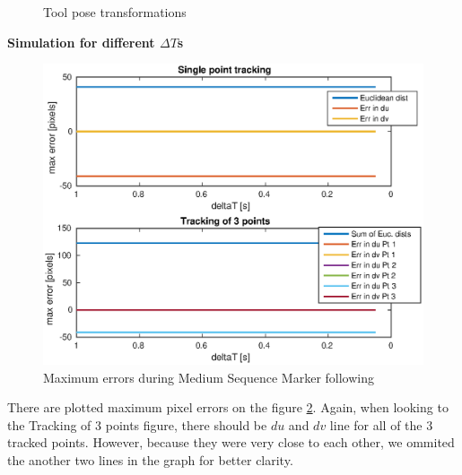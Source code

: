 \documentclass[]{scrartcl}
\begin{document}
\begin{figure}[!htp]
	\hfill
	\caption{Tool pose transformations}
	\label{fig:MediumSequenceToolPose}
\end{figure}

\vspace{0.5cm}
\textbf{Simulation for different $\Delta T$s} \\
\begin{figure}
	\centering
	\includegraphics[width=0.7\linewidth]{fig/MediumSequence_errors.eps}
	\caption{Maximum errors during Medium Sequence Marker following}
	\label{fig:MediumSequence_errors}
\end{figure}
There are plotted maximum pixel errors on the figure \ref{fig:MediumSequence_errors}. Again, when looking to the Tracking of 3 points figure, there should be $du$ and $dv$ line for all of the 3 tracked points. However, because they were very close to each other, we ommited the another two lines in the graph for better clarity. 
\end{document}
